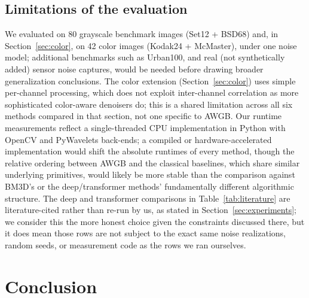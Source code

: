 \documentclass[final,3p,times,twocolumn,nopreprintline]{elsarticle}
\begin{document}
\subsection{Limitations of the evaluation}
We evaluated on 80 grayscale benchmark images (Set12 + BSD68) and, in Section~\ref{sec:color}, on 42 color images (Kodak24 + McMaster), under one noise model; additional benchmarks such as Urban100, and real (not synthetically added) sensor noise captures, would be needed before drawing broader generalization conclusions. The color extension (Section~\ref{sec:color}) uses simple per-channel processing, which does not exploit inter-channel correlation as more sophisticated color-aware denoisers do; this is a shared limitation across all six methods compared in that section, not one specific to AWGB. Our runtime measurements reflect a single-threaded CPU implementation in Python with OpenCV and PyWavelets back-ends; a compiled or hardware-accelerated implementation would shift the absolute runtimes of every method, though the relative ordering between AWGB and the classical baselines, which share similar underlying primitives, would likely be more stable than the comparison against BM3D's or the deep/transformer methods' fundamentally different algorithmic structure. The deep and transformer comparisons in Table~\ref{tab:literature} are literature-cited rather than re-run by us, as stated in Section~\ref{sec:experiments}; we consider this the more honest choice given the constraints discussed there, but it does mean those rows are not subject to the exact same noise realizations, random seeds, or measurement code as the rows we ran ourselves.

\section{Conclusion}
\label{sec:conclusion}
\end{document}
